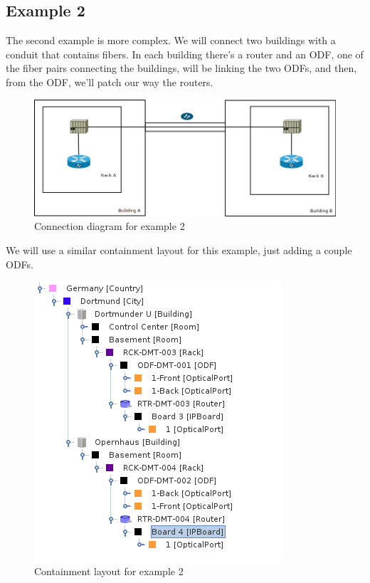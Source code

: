 \documentclass[a4paper]{article}
\begin{document}
		\subsection{Example 2}	
			The second example is more complex. We will connect two buildings with a conduit that contains fibers. In each building there's a router and an ODF, one of the fiber pairs connecting the buildings, will be linking the two ODFs, and then, from the ODF, we'll patch our way the routers.
			\begin{figure}[h!]
				\centering
				\includegraphics[width=0.8\linewidth]{img/l1_example_2.png}
				\caption{Connection diagram for example 2}
				\label{fig:l1_example_2}
			\end{figure}
			\newpage
			We will use a similar containment layout for this example, just adding a couple ODFs.
			\begin{figure}[h!]
				\centering
				\includegraphics[width=0.4\linewidth]{img/l1_example_2_layout.png}
				\caption{Containment layout for example 2}
				\label{fig:l1_example_2_layout}
			\end{figure}
			
\end{document}
